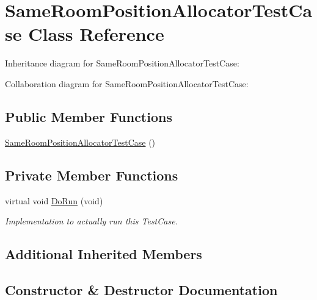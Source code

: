 \hypertarget{classSameRoomPositionAllocatorTestCase}{}\section{Same\+Room\+Position\+Allocator\+Test\+Case Class Reference}
\label{classSameRoomPositionAllocatorTestCase}


Inheritance diagram for Same\+Room\+Position\+Allocator\+Test\+Case\+:


Collaboration diagram for Same\+Room\+Position\+Allocator\+Test\+Case\+:
\subsection*{Public Member Functions}
\begin{DoxyCompactItemize}
\item 
\hyperlink{classSameRoomPositionAllocatorTestCase_a451ed3da5f21b5b4879a7e38851c5ce8}{Same\+Room\+Position\+Allocator\+Test\+Case} ()
\end{DoxyCompactItemize}
\subsection*{Private Member Functions}
\begin{DoxyCompactItemize}
\item 
virtual void \hyperlink{classSameRoomPositionAllocatorTestCase_a1c65ff018a0af3cd828b7c52d8a484f1}{Do\+Run} (void)
\begin{DoxyCompactList}\small\item\em Implementation to actually run this Test\+Case. \end{DoxyCompactList}\end{DoxyCompactItemize}
\subsection*{Additional Inherited Members}


\subsection{Constructor \& Destructor Documentation}
